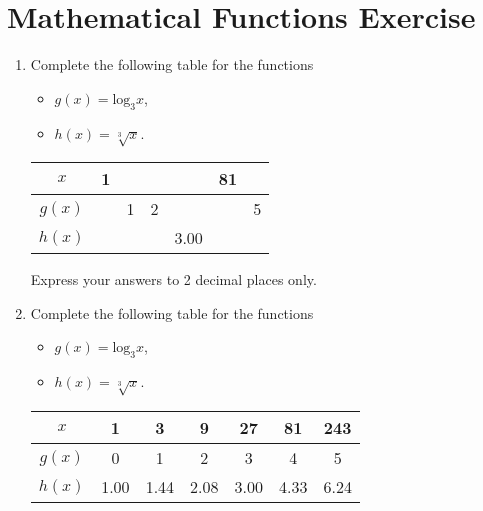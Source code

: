 

\section*{Mathematical Functions Exercise}

\begin{enumerate}
\item Complete the following table for the functions 
\begin{itemize}
\item $g(x) = \mbox{log}_3x$,
\item $h(x) =\sqrt[3]{x}$.
\end{itemize} 
\begin{center}

\begin{tabular}{|c||c|c|c|c|c|c|}
\hline $x$ &  \phantom{p}1\phantom{p}&  &  &  & 81 &  \\ 
\hline \phantom{p} $g(x)$ \phantom{p}&  & \phantom{p}1\phantom{p} & \phantom{p}2\phantom{p} &  &  &  \phantom{p}5\phantom{p} \\ 
\hline \phantom{p}$h(x)$ \phantom{p}&  &  &  &  3.00 & \phantom{p}\phantom{p}\phantom{p}  &  \\ 
\hline 
\end{tabular} 
\end{center}

Express your answers to 2 decimal places only.



\item 
Complete the following table for the functions 
\begin{itemize}
\item $g(x) = \mbox{log}_3x$,
\item $h(x) =\sqrt[3]{x}$.
\end{itemize} 
\begin{center}

\begin{tabular}{|c||c|c|c|c|c|c|}
\hline $x$ & 1	&	3	&	9	&	27	&	81	&	243	\\ \hline
\phantom{p} $g(x)$ \phantom{p}&0	&	1	&	2	&	3	&	4	&	5	\\ \hline
\phantom{p}$h(x)$ \phantom{p}&  1.00	&	1.44	&	2.08	&	3.00	&	4.33	&	6.24	\\ \hline
\end{tabular} 
\end{center}


\end{enumerate}
